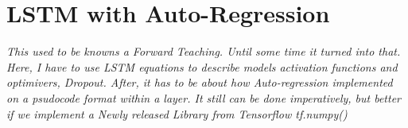 \section{LSTM with Auto-Regression} \label{sec:layer}
\textit{This used to be knowns a Forward Teaching. Until some time it turned into that. Here, I have to use LSTM equations to describe models activation functions and optimivers, Dropout. After, it has to be about how Auto-regression implemented on a psudocode format within a layer.
It still can be done imperatively, but better if we implement a Newly released Library from Tensorflow tf.numpy()}